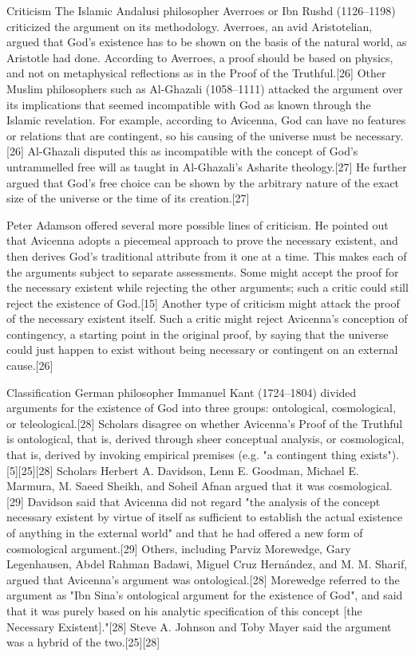 Criticism
The Islamic Andalusi philosopher Averroes or Ibn Rushd (1126–1198) criticized the argument on its methodology. Averroes, an avid Aristotelian, argued that God's existence has to be shown on the basis of the natural world, as Aristotle had done. According to Averroes, a proof should be based on physics, and not on metaphysical reflections as in the Proof of the Truthful.[26] Other Muslim philosophers such as Al-Ghazali (1058–1111) attacked the argument over its implications that seemed incompatible with God as known through the Islamic revelation. For example, according to Avicenna, God can have no features or relations that are contingent, so his causing of the universe must be necessary.[26] Al-Ghazali disputed this as incompatible with the concept of God's untrammelled free will as taught in Al-Ghazali's Asharite theology.[27] He further argued that God's free choice can be shown by the arbitrary nature of the exact size of the universe or the time of its creation.[27]

Peter Adamson offered several more possible lines of criticism. He pointed out that Avicenna adopts a piecemeal approach to prove the necessary existent, and then derives God's traditional attribute from it one at a time. This makes each of the arguments subject to separate assessments. Some might accept the proof for the necessary existent while rejecting the other arguments; such a critic could still reject the existence of God.[15] Another type of criticism might attack the proof of the necessary existent itself. Such a critic might reject Avicenna's conception of contingency, a starting point in the original proof, by saying that the universe could just happen to exist without being necessary or contingent on an external cause.[26]

Classification
German philosopher Immanuel Kant (1724–1804) divided arguments for the existence of God into three groups: ontological, cosmological, or teleological.[28] Scholars disagree on whether Avicenna's Proof of the Truthful is ontological, that is, derived through sheer conceptual analysis, or cosmological, that is, derived by invoking empirical premises (e.g. "a contingent thing exists").[5][25][28] Scholars Herbert A. Davidson, Lenn E. Goodman, Michael E. Marmura, M. Saeed Sheikh, and Soheil Afnan argued that it was cosmological.[29] Davidson said that Avicenna did not regard "the analysis of the concept necessary existent by virtue of itself as sufficient to establish the actual existence of anything in the external world" and that he had offered a new form of cosmological argument.[29] Others, including Parviz Morewedge, Gary Legenhausen, Abdel Rahman Badawi, Miguel Cruz Hernández, and M. M. Sharif, argued that Avicenna's argument was ontological.[28] Morewedge referred to the argument as "Ibn Sina's ontological argument for the existence of God", and said that it was purely based on his analytic specification of this concept [the Necessary Existent]."[28] Steve A. Johnson and Toby Mayer said the argument was a hybrid of the two.[25][28]

